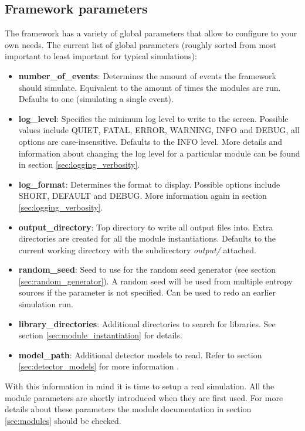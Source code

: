 \subsection{Framework parameters}
\label{sec:framework_parameters}
The framework has a variety of global parameters that allow to configure \apsq to your own needs. The current list of global parameters (roughly sorted from most important to least important for typical simulations):
\begin{itemize}
\item \textbf{number\_of\_events}: Determines the amount of events the framework should simulate. Equivalent to the amount of times the modules are run. Defaults to one (simulating a single event).
\item \textbf{log\_level}: Specifies the minimum log level to write to the screen. Possible values include QUIET, FATAL, ERROR, WARNING, INFO and DEBUG, all options are case-insensitive. Defaults to the INFO level. More details and information about changing the log level for a particular module can be found in section \ref{sec:logging_verbosity}.
\item \textbf{log\_format}: Determines the format to display. Possible options include SHORT, DEFAULT and DEBUG. More information again in section \ref{sec:logging_verbosity}.
\item \textbf{output\_directory}: Top directory to write all output files into. Extra directories are created for all the module instantiations. Defaults to the current working directory with the subdirectory \textit{output/} attached.
\item \textbf{random\_seed}: Seed to use for the random seed generator (see section \ref{sec:random_generator}). A random seed will be used from multiple entropy sources if the parameter is not specified. Can be used to redo an earlier simulation run.
\item \textbf{library\_directories}: Additional directories to search for libraries. See section \ref{sec:module_instantiation} for details.
\item \textbf{model\_path}: Additional detector models to read. Refer to section \ref{sec:detector_models} for more information .
\end{itemize}

With this information in mind it is time to setup a real simulation. All the module parameters are shortly introduced when they are first used. For more details about these parameters the module documentation in section \ref{sec:modules} should be checked.

